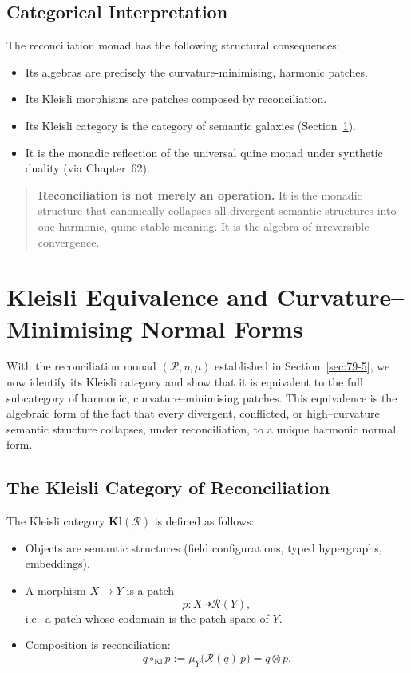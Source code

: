 \subsection{Categorical Interpretation}
\label{subsec:79-5-interpretation}

The reconciliation monad has the following structural consequences:

\begin{itemize}
\item Its algebras are precisely the curvature-minimising, harmonic patches.
\item Its Kleisli morphisms are patches composed by reconciliation.
\item Its Kleisli category is the category of semantic galaxies
      (Section~\ref{sec:79-6}).
\item It is the monadic reflection of the universal quine monad under
      synthetic duality (via Chapter~62).
\end{itemize}

\begin{quote}
\textbf{Reconciliation is not merely an operation.}  
It is the monadic structure that canonically collapses all divergent
semantic structures into one harmonic, quine-stable meaning.  
It is the algebra of irreversible convergence.
\end{quote}

\section{Kleisli Equivalence and Curvature–Minimising Normal Forms}
\label{sec:79-6}

With the reconciliation monad $(\mathcal{R},\eta,\mu)$ established in
Section~\ref{sec:79-5}, we now identify its Kleisli category and show
that it is equivalent to the full subcategory of harmonic, curvature–minimising
patches.  
This equivalence is the algebraic form of the fact that every divergent,
conflicted, or high–curvature semantic structure collapses, under reconciliation,
to a unique harmonic normal form.

\subsection{The Kleisli Category of Reconciliation}
\label{subsec:79-6-kleisli}

The Kleisli category $\mathbf{Kl}(\mathcal{R})$ is defined as follows:

\begin{itemize}
\item Objects are semantic structures (field configurations, typed hypergraphs,
      embeddings).
\item A morphism $X \to Y$ is a patch
      \[
      p : X \dasharrow \mathcal{R}(Y),
      \]
      i.e.\ a patch whose codomain is the patch space of $Y$.
\item Composition is reconciliation:
      \[
      q \circ_{\mathrm{Kl}} p := \mu_Y\bigl(\mathcal{R}(q)\, p\bigr)
      = q \otimes p.
      \]
\end{itemize}


